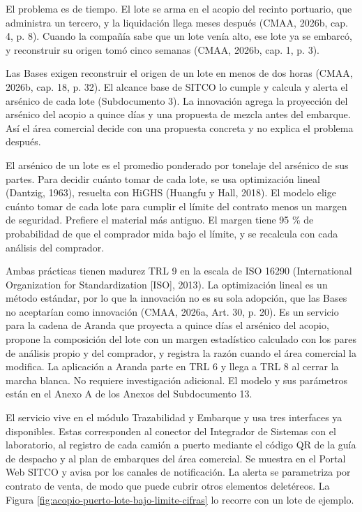 \documentclass[subdoc]{../../comun/overfore}
\begin{document}
El problema es de tiempo. El lote se arma en el acopio del recinto portuario, que administra un tercero, y la liquidación llega meses después (CMAA, 2026b, cap. 4, p. 8). Cuando la compañía sabe que un lote venía alto, ese lote ya se embarcó, y reconstruir su origen tomó cinco semanas (CMAA, 2026b, cap. 1, p. 3).

Las Bases exigen reconstruir el origen de un lote en menos de dos horas (CMAA, 2026b, cap. 18, p. 32). El alcance base de SITCO lo cumple y calcula y alerta el arsénico de cada lote (Subdocumento 3). La innovación agrega la proyección del arsénico del acopio a quince días y una propuesta de mezcla antes del embarque. Así el área comercial decide con una propuesta concreta y no explica el problema después.

El arsénico de un lote es el promedio ponderado por tonelaje del arsénico de sus partes. Para decidir cuánto tomar de cada lote, se usa optimización lineal (Dantzig, 1963), resuelta con HiGHS (Huangfu y Hall, 2018). El modelo elige cuánto tomar de cada lote para cumplir el límite del contrato menos un margen de seguridad. Prefiere el material más antiguo. El margen tiene 95 \% de probabilidad de que el comprador mida bajo el límite, y se recalcula con cada análisis del comprador.

Ambas prácticas tienen madurez TRL 9 en la escala de ISO 16290 (International Organization for Standardization [ISO], 2013). La optimización lineal es un método estándar, por lo que la innovación no es su sola adopción, que las Bases no aceptarían como innovación (CMAA, 2026a, Art. 30, p. 20). Es un servicio para la cadena de Aranda que proyecta a quince días el arsénico del acopio, propone la composición del lote con un margen estadístico calculado con los pares de análisis propio y del comprador, y registra la razón cuando el área comercial la modifica. La aplicación a Aranda parte en TRL 6 y llega a TRL 8 al cerrar la marcha blanca. No requiere investigación adicional. El modelo y sus parámetros están en el Anexo A de los Anexos del Subdocumento 13.

El servicio vive en el módulo Trazabilidad y Embarque y usa tres interfaces ya disponibles. Estas corresponden al conector del Integrador de Sistemas con el laboratorio, al registro de cada camión a puerto mediante el código QR de la guía de despacho y al plan de embarques del área comercial. Se muestra en el Portal Web SITCO y avisa por los canales de notificación. La alerta se parametriza por contrato de venta, de modo que puede cubrir otros elementos deletéreos. La Figura \ref{fig:acopio-puerto-lote-bajo-limite-cifras} lo recorre con un lote de ejemplo.
\end{document}
